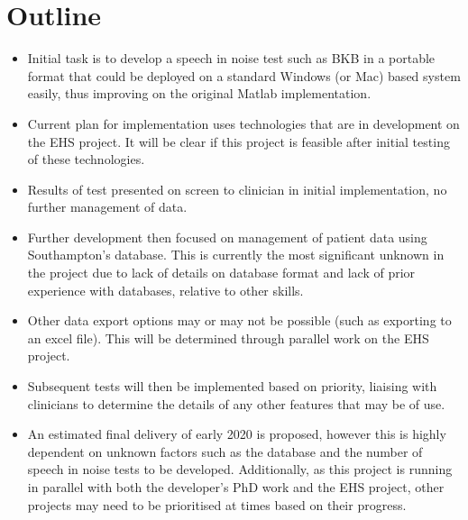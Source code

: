 \section*{Outline}\label{Section:Introduction}
\begin{itemize}
    \item Initial task is to develop a speech in noise test such as BKB in a
        portable format that could be deployed on a standard Windows (or Mac)
        based system easily, thus improving on the original Matlab implementation.
    \item Current plan for implementation uses technologies that are in
        development on the EHS project. It will be clear if this project is
        feasible after initial testing of these technologies.
    \item Results of test presented on screen to clinician in initial
        implementation, no further management of data.
    \item Further development then focused on management of patient data using
        Southampton's database. This is currently the most significant unknown
        in the project due to lack of details on database format and lack of
        prior experience with databases, relative to other skills.
    \item Other data export options may or may not be possible (such as
        exporting to an excel file). This will be determined through parallel
        work on the EHS project.
    \item Subsequent tests will then be implemented based on priority, liaising
        with clinicians to determine the details of any other features that may
        be of use.
    \item An estimated final delivery of early 2020 is proposed, however this
        is highly dependent on unknown factors such as the database and the
        number of speech in noise tests to be developed.  Additionally, as this
        project is running in parallel with both the developer's PhD work and
        the EHS project, other projects may need to be prioritised at times
        based on their progress.
\end{itemize}

